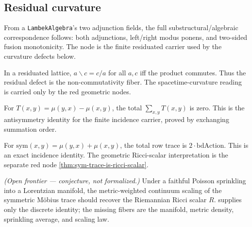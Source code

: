 \subsection{Residual curvature}

\begin{theorem}\label{thm:lambek-biresiduation}\leanok{}
From a \texttt{LambekAlgebra}'s two adjunction fields, the full
substructural/algebraic correspondence follows: both adjunctions, left/right
modus ponens, and two-sided fusion monotonicity.  The node is the finite
residuated carrier used by the curvature defects below.
\end{theorem}

\begin{theorem}\label{thm:residual-coincidence-iff-commutative}\leanok{}
In a residuated lattice, $a\backslash c=c/a$ for all $a,c$ iff the product
commutes.  Thus the residual defect is the non-commutativity fiber.  The
spacetime-curvature reading is carried only by the red geometric nodes.
\end{theorem}

\begin{theorem}\label{thm:mobius-tensor-total-zero}\leanok{}
For $T(x,y)=\mu(y,x)-\mu(x,y)$, the total $\sum_{x,y}T(x,y)$ is zero.  This is
the antisymmetry identity for the finite incidence carrier, proved by exchanging
summation order.
\end{theorem}

\begin{theorem}\label{thm:sym-mobius-trace-two-action}\leanok{}
For $\mathrm{sym}(x,y)=\mu(y,x)+\mu(x,y)$, the total row trace is
$2\cdot\mathrm{bdAction}$.  This is an exact incidence identity.  The
geometric Ricci-scalar interpretation is the separate red node
\cref{thm:sym-trace-is-ricci-scalar}.
\end{theorem}

\begin{theorem}\label{thm:sym-trace-is-ricci-scalar}\notready{}
\emph{(Open frontier --- conjecture, not formalized.)} Under a faithful Poisson
sprinkling into a Lorentzian manifold, the metric-weighted continuum scaling of
the symmetric M\"obius trace should recover the Riemannian Ricci scalar $R$.
 supplies only the discrete identity; the
missing fibers are the manifold, metric density, sprinkling average, and scaling
law.
\end{theorem}
